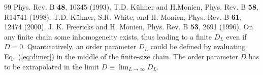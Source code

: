 \documentclass[prl,twocolumn,superscriptaddress,showpacs,floatfix]{revtex4}
\begin{document}
\begin{thebibliography}{99}
        Phys. Rev. B {\bf 48}, 10345 (1993).
        T.D. K\"uhner and H.Monien,
        Phys. Rev. B {\bf 58}, R14741 (1998).
        T.D. K\"uhner, S.R. White, and H. Monien,
        Phys. Rev. B {\bf 61}, 12474 (2000).
        J. K. Freericks and H. Monien, Phys. Rev. B {\bf 53}, 2691 (1996).
	On any finite chain some inhomogeneity exists, thus leading to a
	finite $D_L$ even if $D=0$. Quantitatively, an order parameter $D_L$
	could be defined by evaluating Eq.~(\ref{eq:dimer}) in the middle
	of the finite-size chain.
	The order parameter $D$ has to be extrapolated in the limit
	$D \equiv \lim_{L\rightarrow\infty} D_L$.
\end{thebibliography}
\end{document}
